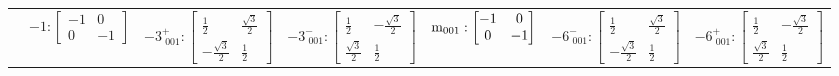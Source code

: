 \documentclass[fleqn,8pt,landscape]{jsarticle}
\begin{document}
\begin{longtable}{ccccccc}
& $ -1:\begin{bmatrix} -1 & 0 \\ 0 & -1 \end{bmatrix} $ & $ -3^{+}_{\,\,001}:\begin{bmatrix} \frac{1}{2} & \frac{\sqrt{3}}{2} \\ - \frac{\sqrt{3}}{2} & \frac{1}{2} \end{bmatrix} $ & $ -3^{-}_{\,\,001}:\begin{bmatrix} \frac{1}{2} & - \frac{\sqrt{3}}{2} \\ \frac{\sqrt{3}}{2} & \frac{1}{2} \end{bmatrix} $ & $ {\rm m}_{001}:\begin{bmatrix} -1 & 0 \\ 0 & -1 \end{bmatrix} $ & $ -6^{-}_{\,\,001}:\begin{bmatrix} \frac{1}{2} & \frac{\sqrt{3}}{2} \\ - \frac{\sqrt{3}}{2} & \frac{1}{2} \end{bmatrix} $ & $ -6^{+}_{\,\,001}:\begin{bmatrix} \frac{1}{2} & - \frac{\sqrt{3}}{2} \\ \frac{\sqrt{3}}{2} & \frac{1}{2} \end{bmatrix} $ \\
\end{longtable}
\end{document}
